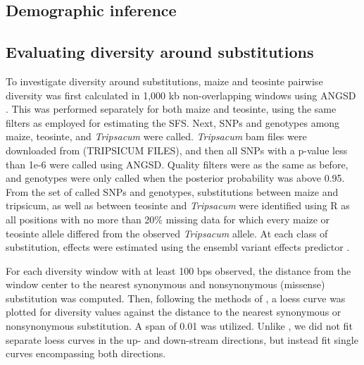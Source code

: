 \documentclass{pnastwo}
\begin{document}
\begin{article}
\begin{materials}
\subsection{Demographic inference}

\subsection{Evaluating diversity around substitutions}
To investigate diversity around substitutions, maize and teosinte pairwise diversity was first
calculated in 1,000 kb non-overlapping windows using ANGSD
\cite{korneliussen2014}. This was performed separately for both maize and
teosinte, using the same filters as employed for estimating the
SFS. Next, SNPs and genotypes among maize, teosinte, and \emph{Tripsacum} were called. \emph{Tripsacum} bam files
were downloaded from \url{}(TRIPSICUM FILES), and then all SNPs with a
p-value less than 1e-6 were called using ANGSD. Quality filters were
as the same as before, and genotypes were only called when the
posterior probability was above 0.95. From the set of called SNPs and
genotypes, substitutions between maize and tripsicum, as well as
between teosinte and \emph{Tripsacum} were identified using R \cite{R2014} as all positions with
no more than 20\% missing data for which every maize or teosinte
allele differed from the observed \emph{Tripsacum} allele. At each class of
substitution, effects were estimated using the ensembl variant effects
predictor \cite{mclaren2010}.

For each diversity window with at least 100 bps observed, the distance from the window center to the
nearest synonymous and nonsynonymous (missense) substitution was
computed. Then, following the methods of \cite{hernandez2011}, a loess
curve was plotted for diversity values against the distance to the
nearest synonymous or nonsynonymous substitution. A span of 0.01 was
utilized. Unlike
\cite{sattath2011}, we did not fit separate loess curves in the up- and
down-stream directions, but instead fit single curves encompassing
both directions.


\end{materials}
\end{article}
\end{document}
